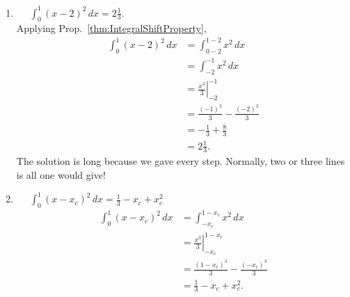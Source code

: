 \begin{enumerate}
\renewcommand{\labelenumi}{(\alph{enumi})}
\setlength{\itemsep}{.2cm}
    \item \Ans~~ $\int_0^1 (x-2)^2 \, dx = 2 \frac{1}{3}$. \\

Applying Prop.~\ref{thm:IntegralShiftProperty},
    \begin{align*}
       \int_0^1 (x-2)^2 \, dx &=   \int_{0-2}^{1-2} x^2 \, dx \\[1em]
       &=  \int_{-2}^{-1} x^2 \, dx \\[1em]
       &= \left. \frac{x^3}{3} \right|_{-2}^{-1} \\[1em]
       &= \frac{(-1)^3}{3} - \frac{(-2)^3}{3} \\
       & =  -\frac{1}{3} +  \frac{8}{3} \\
       & =  2 \frac{1}{3}.
    \end{align*}
    The solution is long because we gave every step. Normally, two or three lines is all one would give!

    \item \Ans ~~ $\int_0^1 (x-x_c)^2 \, dx = \frac{1}{3} -x_c + x_c^2$\\
    
        \begin{align*}
       \int_0^1 (x-x_c)^2 \, dx &=   \int_{-x_c}^{1-x_c} x^2 \, dx \\[1em]
       &= \left. \frac{x^3}{3} \right|_{-x_c}^{1-x_c} \\[1em]
       &= \frac{(1-x_c)^3}{3} - \frac{(-x_c)^3}{3} \\
       & =   \frac{1}{3} -x_c + x_c^2.
    \end{align*}

  \begin{figure}[htb]%
\centering
{}%
\hfill%
%
    \label{fig:ShiftingAndArea}
\end{figure}  


\end{enumerate}
